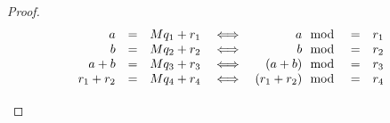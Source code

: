 \begin{lemma}
\end{lemma}
\begin{proof}
\[
\begin{array}{rclcrcl}
  a       &=& Mq_1 + r_1   &\iff& a        \mod &=& r_1   \\
  b       &=& Mq_2 + r_2   &\iff& b        \mod &=& r_2   \\
  a+b     &=& Mq_3 + r_3   &\iff& (a+b)    \mod &=& r_3   \\
  r_1+r_2 &=& Mq_4 + r_4   &\iff& (r_1+r_2)\mod &=& r_4
\end{array}
\]
\begin{eqnarray*}
\end{eqnarray*}
\end{proof}

